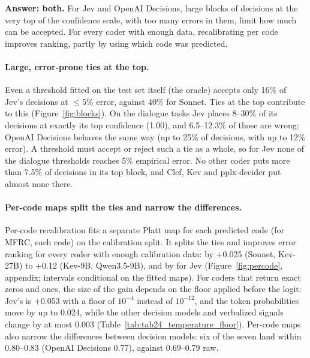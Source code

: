 \textbf{Answer: both.} For Jev and OpenAI Decisions, large blocks of decisions at the very top of the confidence scale, with
too many errors in them, limit how much can be accepted. For every coder with enough data, recalibrating per code improves
ranking, partly by using which code was predicted.

\paragraph{Large, error-prone ties at the top.} Even a threshold fitted on the test set itself (the oracle) accepts only 16\%
of Jev's decisions at $\le$5\% error, against 40\% for Sonnet. Ties at the top contribute to this (Figure~\ref{fig:blocks}).
On the dialogue tasks Jev places 8--30\% of its decisions at exactly its top confidence (1.00), and 6.5--12.3\% of those are
wrong; OpenAI Decisions behaves the same way (up to 25\% of decisions, with up to 12\% error). A threshold must accept or
reject such a tie as a whole, so for Jev none of the dialogue thresholds reaches 5\% empirical error. No other coder puts more
than 7.5\% of decisions in its top block, and Clef, Kev and pplx-decider put almost none there.

\paragraph{Per-code maps split the ties and narrow the differences.} Per-code recalibration fits a separate Platt map for each
predicted code (for MFRC, each code) on the calibration split. It splits the ties and improves error ranking for every coder
with enough calibration data: by $+$0.025 (Sonnet, Kev-27B) to $+$0.12 (Kev-9B, Qwen3.5-9B), and by
 for Jev (Figure~\ref{fig:percode}, appendix; intervals conditional on the fitted maps). For
coders that return exact zeros and ones, the size of the gain depends on the floor applied before the logit: Jev's is
$+$0.053 with a floor of $10^{-4}$ instead of $10^{-12}$, and the token probabilities move by up to 0.024, while the other
decision models and verbalized signals change by at most 0.003 (Table~\ref{tab:tab24_temperature_floor}). Per-code maps also
narrow the differences between decision models: six of the seven land within 0.80--0.83 (OpenAI Decisions 0.77), against
0.69--0.79 raw.

